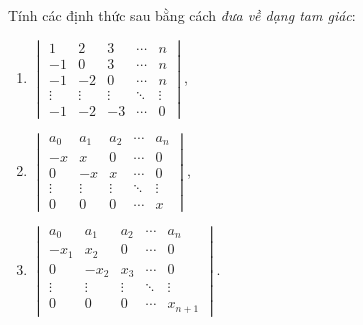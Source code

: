 \documentclass[class=linearalgebra,crop=false]{standalone}
\begin{document}
\begin{exercise}
    \par Tính các định thức sau bằng cách \textit{đưa về dạng tam giác}:
    \begin{enumerate}[label = (\alph*)]
        \item $\begin{vmatrix} 1 & 2 & 3 & \cdots & n \\ -1 & 0 & 3 & \cdots & n \\ -1 & -2 & 0 & \cdots & n \\ \vdots & \vdots & \vdots & \ddots & \vdots \\ -1 & -2 & -3 & \cdots & 0 \end{vmatrix}$,
        \item $\begin{vmatrix} a_{0} & a_{1} & a_{2} & \cdots & a_{n} \\ -x & x & 0 & \cdots & 0 \\ 0 & -x & x & \cdots & 0 \\ \vdots & \vdots & \vdots & \ddots & \vdots \\ 0 & 0 & 0 & \cdots & x \end{vmatrix}$,
        \item $\begin{vmatrix} a_{0} & a_{1} & a_{2} & \cdots & a_{n} \\ -x_{1} & x_{2} & 0 & \cdots & 0 \\ 0 & -x_{2} & x_{3} & \cdots & 0 \\ \vdots & \vdots & \vdots & \ddots & \vdots \\ 0 & 0 & 0 & \cdots & x_{n+1} \end{vmatrix}$.
    \end{enumerate}
\end{exercise}
\end{document}
